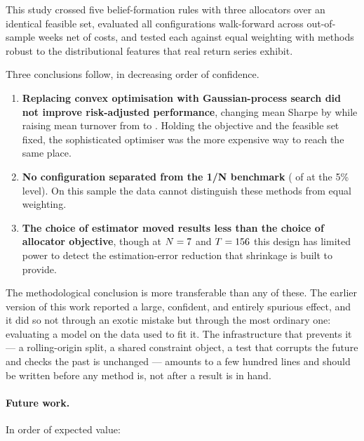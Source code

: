 
This study crossed five belief-formation rules with three allocators over an
identical feasible set, evaluated all \nTrials{} configurations walk-forward across
\oosPeriods{} out-of-sample weeks net of costs, and tested each against equal
weighting with methods robust to the distributional features that real return
series exhibit.

Three conclusions follow, in decreasing order of confidence.

\begin{enumerate}[noitemsep]
  \item \textbf{Replacing convex optimisation with Gaussian-process search did not
  improve risk-adjusted performance}, changing mean Sharpe by \optimiserDelta{}
  while raising mean turnover from \convexTurnover{} to \gpTurnover{}. Holding the
  objective and the feasible set fixed, the sophisticated optimiser was the more
  expensive way to reach the same place.
  \item \textbf{No configuration separated from the 1/N benchmark}
  (\nBeatingBenchmark{} of \nStrategies{} at the 5\% level). On this sample the
  data cannot distinguish these methods from equal weighting.
  \item \textbf{The choice of estimator moved results less than the choice of
  allocator objective}, though at $N=7{}$ and $T=156{}$ this
  design has limited power to detect the estimation-error reduction that shrinkage
  is built to provide.
\end{enumerate}

The methodological conclusion is more transferable than any of these. The earlier
version of this work reported a large, confident, and entirely spurious effect,
and it did so not through an exotic mistake but through the most ordinary one:
evaluating a model on the data used to fit it. The infrastructure that prevents it
--- a rolling-origin split, a shared constraint object, a test that corrupts the
future and checks the past is unchanged --- amounts to a few hundred lines and
should be written before any method is, not after a result is in hand.

\paragraph{Future work.} In order of expected value:

